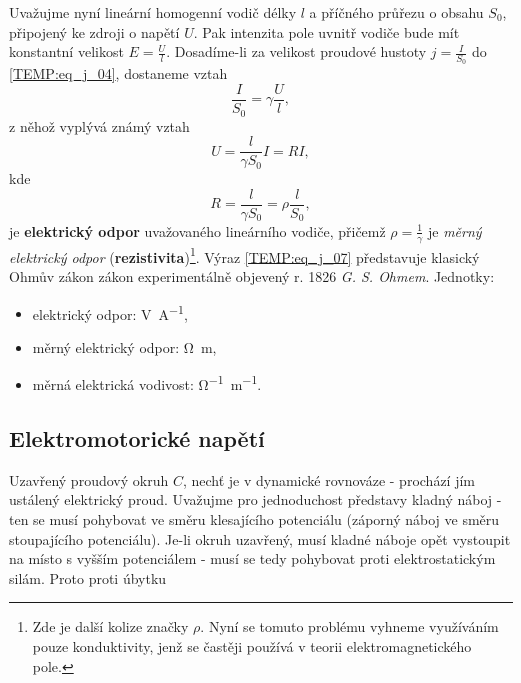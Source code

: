       Uvažujme nyní lineární homogenní vodič délky $l$ a příčného průřezu o obsahu $S_0$, připojený
      ke zdroji o napětí $U$. Pak intenzita pole uvnitř vodiče bude mít konstantní velikost
      $E=\frac{U}{l}$. Dosadíme-li za velikost proudové hustoty $j=\frac{I}{S_0}$ do
      \ref{TEMP:eq_j_04}, dostaneme vztah
      \begin{equation}\label{TEMP:eq_j_05}
        \frac{I}{S_0} = \gamma\frac{U}{l},
      \end{equation}        
      z něhož vyplývá známý vztah
      \begin{equation}\label{TEMP:eq_j_06}
        U = \frac{l}{\gamma S_0}I = RI,
      \end{equation}              
      kde
      \begin{equation}\label{TEMP:eq_j_07}
        R = \frac{l}{\gamma S_0} = \rho\frac{l}{S_0},
      \end{equation} 
      je \textbf{elektrický odpor} uvažovaného lineárního vodiče, přičemž $\rho = \frac{1}{\gamma}$
      je \emph{měrný elektrický odpor} (\textbf{rezistivita})\footnote{Zde je další kolize značky
      $\rho$. Nyní se tomuto problému vyhneme využíváním pouze konduktivity, jenž se častěji
      používá v teorii elektromagnetického pole.}. Výraz \ref{TEMP:eq_j_07} představuje klasický
      Ohmův zákon zákon experimentálně objevený r. 1826 \emph{G. S. Ohmem}. Jednotky:
      \begin{itemize}\addtolength{\itemsep}{-0.5\baselineskip}
        \item elektrický odpor: \si{V.A^{-1}},
        \item měrný elektrický odpor: \si{\ohm.m},
        \item měrná elektrická vodivost: \si{\ohm^{-1}.m^{-1}}.
      \end{itemize}

        

    \subsection{Elektromotorické napětí}
      Uzavřený proudový okruh $C$, nechť je v dynamické rovnováze - prochází jím ustálený
      elektrický proud. Uvažujme pro jednoduchost představy kladný náboj - ten se musí pohybovat ve
      směru klesajícího potenciálu (záporný náboj ve směru stoupajícího potenciálu). Je-li okruh
      uzavřený, musí kladné náboje opět vystoupit na místo s vyšším potenciálem - musí se tedy
      pohybovat proti elektrostatickým silám. Proto proti úbytku      
               
